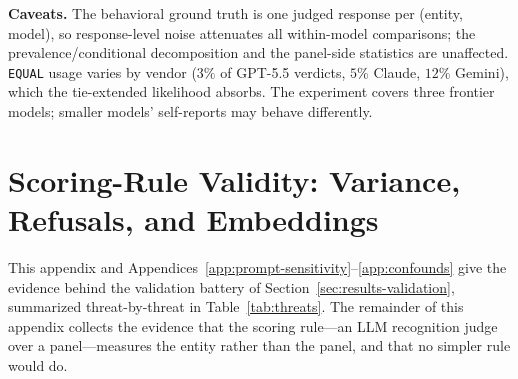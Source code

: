 \textbf{Caveats.} The behavioral ground truth is one judged response per (entity, model), so response-level noise attenuates all within-model comparisons; the prevalence/conditional decomposition and the panel-side statistics are unaffected. \texttt{EQUAL} usage varies by vendor ($3\%$ of GPT-5.5 verdicts, $5\%$ Claude, $12\%$ Gemini), which the tie-extended likelihood absorbs. The experiment covers three frontier models; smaller models' self-reports may behave differently.


\section{Scoring-Rule Validity: Variance, Refusals, and Embeddings}
\label{app:scoring}
\label{app:variance}

This appendix and Appendices~\ref{app:prompt-sensitivity}--\ref{app:confounds} give the evidence behind the validation battery of Section~\ref{sec:results-validation}, summarized threat-by-threat in Table~\ref{tab:threats}. The remainder of this appendix collects the evidence that the scoring rule---an LLM recognition judge over a panel---measures the entity rather than the panel, and that no simpler rule would do.

